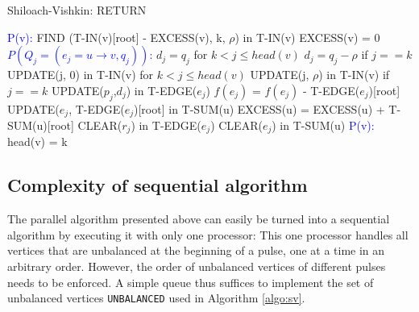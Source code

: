 \documentclass[a4paper,10pt, twocolumn]{article}
\begin{document}
\begin{algorithm}
\caption{Shiloach-Vishkin: RETURN}
\label{algo:sv_return}
\begin{algorithmic}[1]
		\State \textcolor{blue}{P(v):}
		\State FIND (T-IN(v)[root] - EXCESS(v), k, $\rho$) in T-IN(v)
		\State EXCESS(v) = 0
		\State \textcolor{blue}{$P(Q_j = (e_j = u \rightarrow v, q_j))$:}
		\State $d_j = q_j$ for $k < j \leq head(v)$
		\State $d_j = q_j - \rho$ if $j == k$
		\State UPDATE(j, 0) in T-IN(v) for $k < j \leq head(v)$
		\State UPDATE(j, $\rho$) in T-IN(v) if $j == k$
		\State UPDATE($p_j$,$d_j$) in T-EDGE($e_j$)
		\State $f(e_j)$ = $f(e_j)$ - T-EDGE($e_j$)[root]
		\State UPDATE($e_j$, T-EDGE($e_j$)[root] in T-SUM(u)
		\State EXCESS(u) = EXCESS(u) + T-SUM(u)[root]
		\State CLEAR($r_j$) in T-EDGE($e_j$)
		\State CLEAR($e_j$) in T-SUM(u)
		\State \textcolor{blue}{P(v):}
		\State head(v) = k
	\EndFunction
\end{algorithmic}
\end{algorithm}

\subsection{Complexity of sequential algorithm}
\label{sec:sv_seq}
The parallel algorithm presented above can easily be turned into a sequential algorithm by executing it with only one processor: This one processor handles all vertices that are unbalanced at the beginning of a pulse, one at a time in an arbitrary order. However, the order of unbalanced vertices of different pulses needs to be enforced. A simple queue thus suffices to implement the set of unbalanced vertices \lstinline|UNBALANCED| used in Algorithm \ref{algo:sv}.
\end{document}

